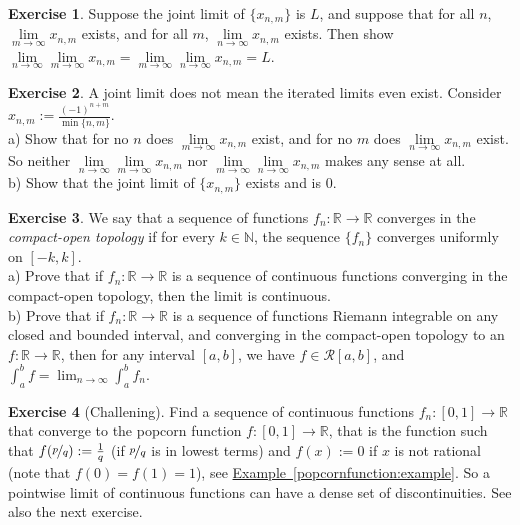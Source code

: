 \documentclass[12pt]{book}
\newcommand{\R}{{\mathbb{R}}}
\newcommand{\N}{{\mathbb{N}}}
\newcommand{\sR}{{\mathcal{R}}}
\newcommand{\myindex}[1]{#1\index{#1}}
\theoremstyle{plain}
\theoremstyle{remark}
\theoremstyle{definition}
\theoremstyle{exercise}
\newtheorem{exercise}{Exercise}[section]
\theoremstyle{example}
\newcommand{\exampleref}[1]{\hyperref[#1]{Example~\ref*{#1}}}
\begin{document}
\begin{exercise}
Suppose the joint limit of $\{ x_{n,m} \}$ is $L$, and suppose
that for all $n$, $\lim\limits_{m \to \infty} x_{n,m}$ exists,
and for all $m$, $\lim\limits_{n \to \infty} x_{n,m}$ exists.  Then show
$\lim\limits_{n\to\infty}\lim\limits_{m \to \infty} x_{n,m}
=
\lim\limits_{m\to\infty}\lim\limits_{n \to \infty} x_{n,m} = L$.
\end{exercise}

\begin{exercise}
A joint limit does not mean the iterated limits even exist.
Consider $x_{n,m} := \frac{{(-1)}^{n+m}}{\min \{n,m \}}$.\\
a) Show that for no $n$ does
$\lim\limits_{m \to \infty} x_{n,m}$ exist, and for no $m$
does 
$\lim\limits_{n \to \infty} x_{n,m}$ exist.  So neither
$\lim\limits_{n\to\infty}\lim\limits_{m \to \infty} x_{n,m}$ nor
$\lim\limits_{m\to\infty}\lim\limits_{n \to \infty} x_{n,m}$ makes any sense
at all.\\
b) Show that the joint limit of $\{ x_{n,m} \}$ exists and is 0.
\end{exercise}

\begin{exercise}
We say that a sequence of functions $f_n \colon \R \to \R$ converges
in the \emph{\myindex{compact-open topology}} if for every $k \in \N$,
the sequence $\{ f_n \}$ converges uniformly on $[-k,k]$.
\\
a) Prove that if $f_n \colon \R \to \R$ is a sequence of
continuous functions converging in the compact-open topology, then
the limit is continuous.
\\
b) 
Prove that if $f_n \colon \R \to \R$ is a sequence of
functions Riemann integrable on any closed and bounded interval,
and converging in the compact-open topology to an $f \colon \R \to \R$,
then for any interval $[a,b]$, we have $f \in \sR[a,b]$, and
$\int_a^b f = \lim_{n\to\infty} \int_a^b f_n$.
\end{exercise}

\begin{exercise}[Challening]
Find a sequence of continuous functions $f_n \colon [0,1] \to \R$ that
converge to the popcorn function $f \colon [0,1] \to \R$, that is the
function such that $f(\nicefrac{p}{q}) := \frac{1}{q}$ (if $\nicefrac{p}{q}$
is in lowest terms) and $f(x) := 0$ if $x$ is not rational (note
that $f(0) = f(1) = 1$),
see \exampleref{popcornfunction:example}.
So a pointwise limit of continuous functions can have a dense set of
discontinuities.  See also the next exercise.
\end{exercise}
\end{document}
